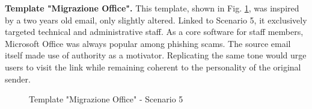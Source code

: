 \documentclass[a4paper]{article}
\begin{document}
\newpage

\noindent
\textbf{Template "Migrazione Office".} This template, shown in Fig. \ref{template-s5b2}, was inspired by a two years old email, only slightly altered. Linked to Scenario 5, it exclusively targeted technical and administrative staff. As a core software for staff members, Microsoft Office was always popular among phishing scams. The source email itself made use of authority as a motivator. Replicating the same tone would urge users to visit the link while remaining coherent to the personality of the original sender.

\bigskip

\begin{figure}[H]
	\centering
	\caption{Template "Migrazione Office" - Scenario 5}
	\label{template-s5b2}
\end{figure}
\end{document}
